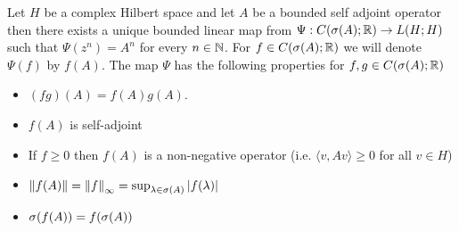 \begin{thm}\label{hilbert:ContinuousFunctionalCalculusBoundedSelfAdjoint}Let $H$ be a complex Hilbert space and let $A$ be a bounded self adjoint operator then there exists a unique bounded linear map from $\Psi : C(\sigma(A); \mathbb{R}) \to L(H;H)$ such that $\Psi(z^n) = A^n$ for every $n \in \mathbb{N}$.  For $f \in  C(\sigma(A); \mathbb{R})$ we will denote $\Psi(f)$ by $f(A)$.  The map $\Psi$ has the following properties for $f,g  \in C(\sigma(A); \mathbb{R})$ 
\begin{itemize}
\item[(i)] $(fg)(A) = f(A) g(A)$.
\item[(ii)] $f(A)$ is self-adjoint
\item[(iii)] If $f \geq 0$ then $f(A)$ is a non-negative operator (i.e. $\langle v, Av \rangle \geq 0$ for all $v \in H$)
\item[(iv)] $\left \lVert f(A) \right \rVert = \left \lVert f \right \rVert_\infty = \sup_{\lambda \in \sigma(A)} \left \vert f(\lambda) \right \vert$
\item[(v)] $\sigma(f(A)) = f(\sigma(A))$
\end{itemize}
\end{thm}
